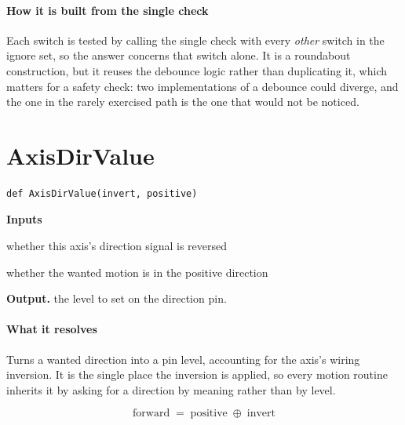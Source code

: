 \paragraph{How it is built from the single check}
Each switch is tested by calling the single check with every \emph{other} switch in the ignore set, so the answer concerns that switch alone. It is a roundabout construction, but it reuses the debounce logic rather than duplicating it, which matters for a safety check: two implementations of a debounce could diverge, and the one in the rarely exercised path is the one that would not be noticed.


\section{AxisDirValue}
\begin{lstlisting}[style=sig]
def AxisDirValue(invert, positive)
\end{lstlisting}

\noindent\textbf{Inputs}
\begin{description}[leftmargin=2.2em,style=nextline,font=\normalfont\ttfamily]\setlength\itemsep{1pt}
  \item[{invert}] \normalfont whether this axis's direction signal is reversed
  \item[{positive}] \normalfont whether the wanted motion is in the positive direction
\end{description}

\noindent\textbf{Output.} the level to set on the direction pin.


\paragraph{What it resolves}
Turns a wanted direction into a pin level, accounting for the axis's wiring inversion. It is the single place the inversion is applied, so every motion routine inherits it by asking for a direction by meaning rather than by level.


\begin{equation}
\mathrm{forward} \;=\; \mathrm{positive} \;\oplus\; \mathrm{invert}
\end{equation}

